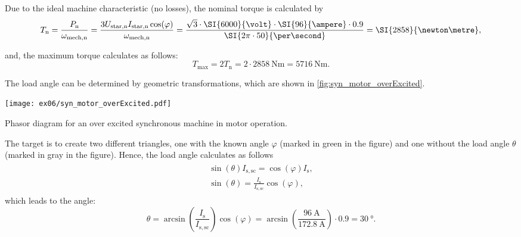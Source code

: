 \begin{solutionblock}

    Due to the ideal machine characteristic (no losses), the nominal torque is calculated by
    \begin{equation}
        T_{\mathrm{n}} = \frac{P_{\mathrm{n}}}{\omega_{\mathrm{mech,n}}}
        = \frac{3 U_{\mathrm{star,n}} I_{\mathrm{star,n}} \cos(\varphi)}{\omega_{\mathrm{mech,n}}}
        = \frac{\sqrt{3}\cdot \SI{6000}{\volt}\cdot\SI{96}{\ampere}\cdot0.9}{\SI{2\pi\cdot50}{\per\second}}
        = \SI{2858}{\newton\metre},
    \end{equation}

    and, the maximum torque calculates as follows:
    \begin{equation}
        T_{\mathrm{max}} = 2 T_{\mathrm{n}}
        = 2 \cdot \SI{2858}{\newton\metre}
        = \SI{5716}{\newton\metre}.
    \end{equation}
    
\end{solutionblock}




\begin{solutionblock}
    The load angle can be determined by geometric transformations, which are shown in \autoref{fig:syn_motor_overExcited}.
    \begin{solutionfigure}
        \centering
        \texttt{[image: ex06/syn\_motor\_overExcited.pdf]}
        \caption{Phasor diagram for an over excited synchronous machine in motor operation.}
        \label{fig:syn_motor_overExcited}
    \end{solutionfigure}
    
    The target is to create two different triangles, one with the known angle $\varphi$ (marked in green in the figure) and one without the load angle $\theta$ (marked in gray in the figure). 
    Hence, the load angle calculates as follows
    \begin{align}
        \begin{split}
            \sin(\theta) I_{\mathrm{s,sc}} = \cos(\varphi)I_{\mathrm{s}},\\
            \sin(\theta) = \frac{I_{\mathrm{s}}}{I_{\mathrm{s,sc}}}\cos(\varphi),
        \end{split}
    \end{align}
    which leads to the angle:
    \begin{equation}
        \theta = \arcsin\left(\frac{I_{\mathrm{s}}}{I_{\mathrm{s,sc}}} \right) \cos(\varphi)
        = \arcsin\left(\frac{\SI{96}{\ampere}}{\SI{172.8}{\ampere}}\right) \cdot 0.9
        = \SI{30}{\degree}.
    \end{equation}
\end{solutionblock}

